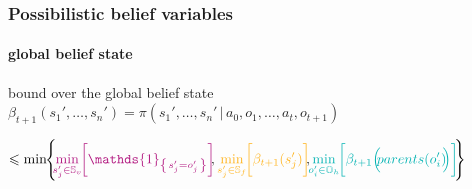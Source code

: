 \documentclass[12pt,svgnames,table]{beamer}
\newcommand{\paren}[1]{\left( \left. #1 \right. \right)}
\newcommand{\set}[1]{\left\{ \left. #1 \right. \right\}}
\newcommand{\sachant}{\, \right| \left. \,}
\begin{document}
\begin{frame}
\frametitle{Possibilistic belief variables}
\framesubtitle{\footnotesize global belief state}
\begin{block}{bound over the global belief state}
$\beta_{t+1}(s_1',\ldots,s_n') = \pi \paren{ s_1',\ldots,s_n' \sachant a_0,o_1, \ldots, a_{t},o_{t+1} } $
\end{block}
\hspace{0.5cm} $ \leqslant \displaystyle \min \hspace{-0.1cm} \Bigg\{ \hspace{-0.1cm} 
{\color{violet} \min_{s_j' \in \mathbb{S}_v} \hspace{-0.1cm} \bigg[ \mathds{1}_{ \set{s_j'=o_j'}} \bigg]} \hspace{-0.1cm}, 
{\color{orangee} \min_{s_j' \in \mathbb{S}_f} \hspace{-0.1cm} \bigg[ \beta_{t+1}(s_j') \bigg]} \hspace{-0.1cm} , \hspace{-0.1cm} 
{\color{gggreen} \min_{o_i' \in \mathbb{O}_h} \hspace{-0.1cm} \bigg[ \beta_{t+1} \Big( \hspace{-0.1cm} parents(o_i') 
\hspace{-0.1cm} \Big) \bigg]} \hspace{-0.1cm}  \Bigg\} \hspace{-0.3cm}$\\
\end{frame}
\end{document}
